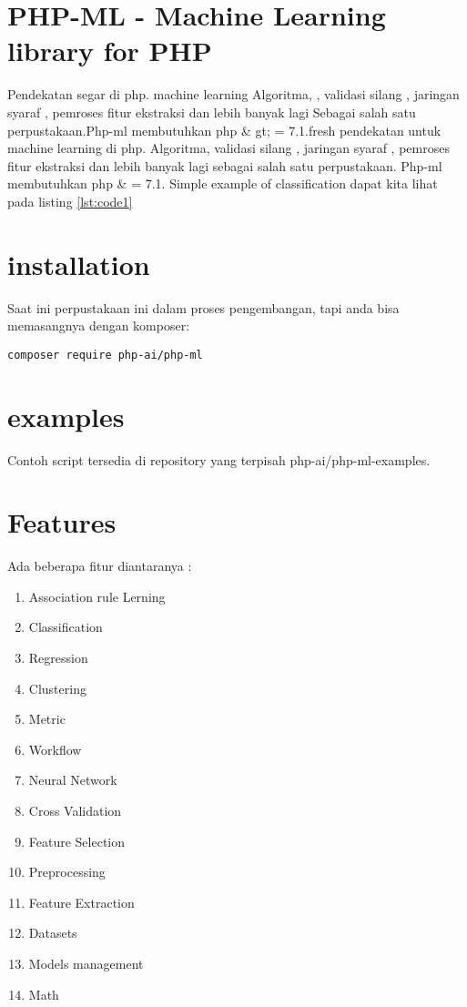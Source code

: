 \section{PHP-ML - Machine Learning library for PHP}
Pendekatan segar di php. machine learning Algoritma, , validasi silang , jaringan syaraf , pemroses fitur ekstraksi dan lebih banyak lagi Sebagai salah satu perpustakaan.Php-ml membutuhkan php \& gt; = 7.1.fresh pendekatan untuk machine learning di php. Algoritma, validasi silang , jaringan syaraf , pemroses fitur ekstraksi dan lebih banyak lagi sebagai salah satu perpustakaan.
Php-ml membutuhkan php \& = 7.1.
Simple example of classification dapat kita lihat pada listing \ref{lst:code1}

\section{installation} 
Saat ini perpustakaan ini dalam proses pengembangan, tapi anda bisa memasangnya dengan komposer:

\begin{verbatim}composer require php-ai/php-ml\end{verbatim}

\section{examples}
Contoh script tersedia di repository yang terpisah php-ai/php-ml-examples.

\section{Features}
Ada beberapa fitur diantaranya :
\begin{enumerate}
\item Association rule Lerning
\item Classification
\item Regression
\item Clustering
\item Metric
\item Workflow
\item Neural Network
\item Cross Validation
\item Feature Selection
\item Preprocessing
\item Feature Extraction
\item Datasets
\item Models management
\item Math
\end{enumerate}

